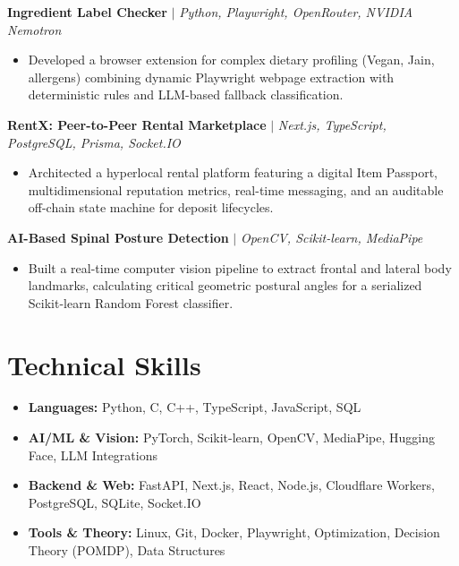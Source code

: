 \documentclass[10pt, a4paper]{article}
\begin{document}
\textbf{Ingredient Label Checker} $|$ \textit{Python, Playwright, OpenRouter, NVIDIA Nemotron}
\begin{itemize}[leftmargin=*, noitemsep, topsep=1pt, parsep=0pt]
    \item Developed a browser extension for complex dietary profiling (Vegan, Jain, allergens) combining dynamic Playwright webpage extraction with deterministic rules and LLM-based fallback classification.
\end{itemize}

\textbf{RentX: Peer-to-Peer Rental Marketplace} $|$ \textit{Next.js, TypeScript, PostgreSQL, Prisma, Socket.IO}
\begin{itemize}[leftmargin=*, noitemsep, topsep=1pt, parsep=0pt]
    \item Architected a hyperlocal rental platform featuring a digital Item Passport, multidimensional reputation metrics, real-time messaging, and an auditable off-chain state machine for deposit lifecycles.
\end{itemize}

\textbf{AI-Based Spinal Posture Detection} $|$ \textit{OpenCV, Scikit-learn, MediaPipe}
\begin{itemize}[leftmargin=*, noitemsep, topsep=1pt, parsep=0pt]
    \item Built a real-time computer vision pipeline to extract frontal and lateral body landmarks, calculating critical geometric postural angles for a serialized Scikit-learn Random Forest classifier.
\end{itemize}

\section{Technical Skills}
\begin{itemize}[leftmargin=*, noitemsep, topsep=1pt]
    \item \textbf{Languages:} Python, C, C++, TypeScript, JavaScript, SQL
    \item \textbf{AI/ML \& Vision:} PyTorch, Scikit-learn, OpenCV, MediaPipe, Hugging Face, LLM Integrations
    \item \textbf{Backend \& Web:} FastAPI, Next.js, React, Node.js, Cloudflare Workers, PostgreSQL, SQLite, Socket.IO
    \item \textbf{Tools \& Theory:} Linux, Git, Docker, Playwright, Optimization, Decision Theory (POMDP), Data Structures
\end{itemize}
\end{document}
